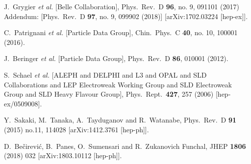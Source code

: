 \documentclass[aps,prd,superscriptaddress,twocolumn,secnumarabic]{revtex4-1}
\begin{document}
\begin{thebibliography}{99}
  J.~Grygier {\it et al.} [Belle Collaboration],
  Phys.\ Rev.\ D {\bf 96}, no. 9, 091101 (2017)
  Addendum: [Phys.\ Rev.\ D {\bf 97}, no. 9, 099902 (2018)]
  [arXiv:1702.03224 [hep-ex]].


  C.~Patrignani {\it et al.} [Particle Data Group],
  Chin.\ Phys.\ C {\bf 40}, no. 10, 100001 (2016).


  J.~Beringer {\it et al.} [Particle Data Group],
  Phys.\ Rev.\ D {\bf 86}, 010001 (2012).


  S.~Schael {\it et al.} [ALEPH and DELPHI and L3 and OPAL and SLD Collaborations and LEP Electroweak Working Group and SLD Electroweak Group and SLD Heavy Flavour Group],
  Phys.\ Rept.\  {\bf 427}, 257 (2006)
  [hep-ex/0509008].

  Y.~Sakaki, M.~Tanaka, A.~Tayduganov and R.~Watanabe,
  Phys.\ Rev.\ D {\bf 91} (2015) no.11,  114028
  [arXiv:1412.3761 [hep-ph]].
  
  D.~Bečirević, B.~Panes, O.~Sumensari and R.~Zukanovich Funchal,
  JHEP {\bf 1806} (2018) 032
  [arXiv:1803.10112 [hep-ph]].


\end{thebibliography}
\end{document}
